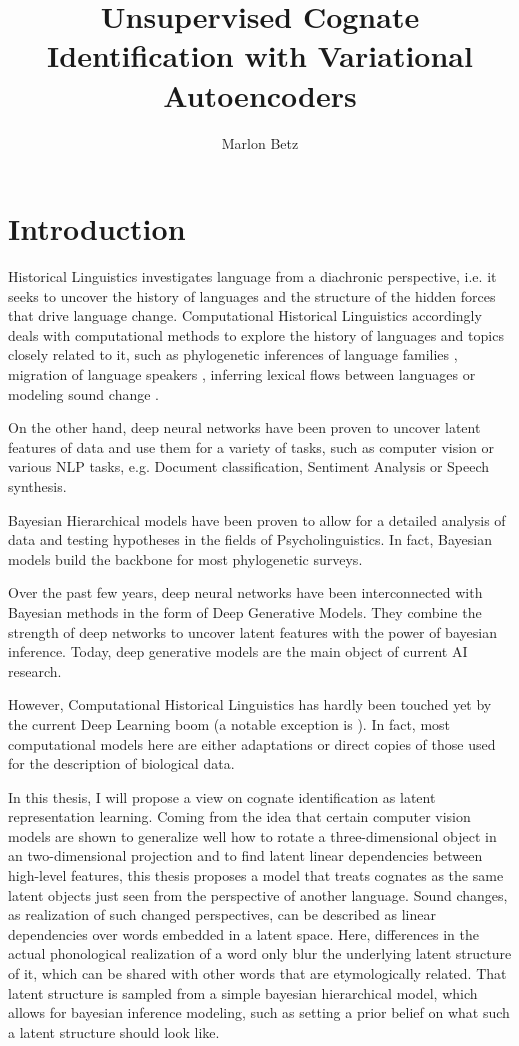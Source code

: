 \documentclass[6pt]{article}
\title{Unsupervised Cognate Identification with Variational Autoencoders}
\author{Marlon Betz}
\begin{document}
\maketitle
\newpage
\tableofcontents
\newpage

\section{Introduction}

Historical Linguistics investigates language from a diachronic perspective, i.e. it seeks to uncover the history of languages and the structure of the hidden forces that drive language change.  Computational Historical Linguistics accordingly deals with computational methods to explore the history of languages and topics closely related to it, such as phylogenetic inferences of language families \cite{bouckaert2012mapping}, migration of language speakers \cite{gray2009language}, inferring lexical flows between languages \cite{dellert2015uralic} or modeling sound change \cite{bouchard2013automated}.  

On the other hand, deep neural networks have been proven to uncover latent features of data and use them for a variety of tasks, such as computer vision or various NLP tasks, e.g. Document classification, Sentiment Analysis or Speech synthesis. 

Bayesian Hierarchical models have been proven to allow for a detailed analysis of data and testing hypotheses in the fields of Psycholinguistics. In fact, Bayesian models build the backbone for most phylogenetic surveys.

Over the past few years, deep neural networks have been interconnected with Bayesian methods in the form of Deep Generative Models. They combine the strength of deep networks to uncover latent features with the power of bayesian inference. Today, deep generative models are the main object of current AI research. 

 However, Computational Historical Linguistics has hardly been touched yet by the current Deep Learning boom (a notable exception is \cite{rama2016siamese}). 
 In fact, most computational models here are either adaptations or direct copies of those used for the description of biological data.

In this thesis, I will propose a view on cognate identification as latent representation learning. Coming from the idea that certain computer vision models are shown to generalize well how to rotate a three-dimensional object in an two-dimensional projection and to find latent linear dependencies between high-level features, this thesis proposes a model that treats cognates as the same latent objects just seen from the perspective of another language. Sound changes, as realization of such changed perspectives, can be described as linear dependencies over words embedded in a latent space. Here, differences in the actual phonological realization of a word only blur the underlying latent structure of it, which can be shared with other words that are etymologically related. That latent structure is sampled from a simple bayesian hierarchical model, which allows for bayesian inference modeling, such as setting a prior belief on what such a latent structure should look like. 
\end{document}
